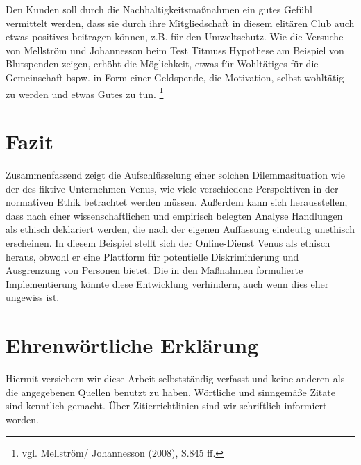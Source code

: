 \documentclass[a4paper, fontsize=12pt, parskip=full, toc=bibliographynumbered]{scrreprt}
\begin{document}
Den Kunden soll durch die Nachhaltigkeitsmaßnahmen ein gutes Gefühl vermittelt werden, dass sie durch ihre Mitgliedschaft in diesem elitären Club auch etwas positives beitragen können, z.B. für den Umweltschutz. Wie die Versuche von Mellström und Johannesson beim Test Titmuss Hypothese am Beispiel von Blutspenden zeigen, erhöht die Möglichkeit, etwas für Wohltätiges für die Gemeinschaft bspw. in Form einer Geldspende, die Motivation, selbst wohltätig zu werden und etwas Gutes zu tun. \footnote{vgl. Mellström/ Johannesson (2008), S.845 ff.} 

\chapter{Fazit}

Zusammenfassend zeigt die Aufschlüsselung einer solchen Dilemmasituation wie der des fiktive Unternehmen Venus, wie viele verschiedene Perspektiven in der normativen Ethik betrachtet werden müssen. Außerdem kann sich herausstellen, dass nach einer wissenschaftlichen und empirisch belegten Analyse Handlungen als ethisch deklariert werden, die nach der eigenen Auffassung eindeutig unethisch erscheinen. In diesem Beispiel stellt sich der Online-Dienst Venus als ethisch heraus, obwohl er eine Plattform für potentielle Diskriminierung und Ausgrenzung von Personen bietet. Die in den Maßnahmen formulierte Implementierung könnte diese Entwicklung verhindern, auch wenn dies eher ungewiss ist. 

\chapter{Ehrenwörtliche Erklärung}

Hiermit versichern wir diese Arbeit selbstständig verfasst und keine
anderen als die angegebenen Quellen benutzt zu haben.  Wörtliche und
sinngemäße Zitate sind kenntlich gemacht.  Über Zitierrichtlinien
sind wir schriftlich informiert worden.
\end{document}
